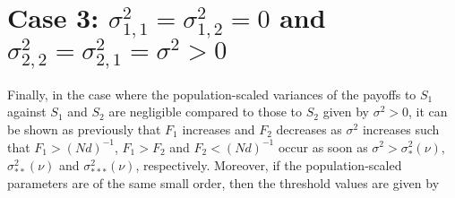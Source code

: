 \documentclass[11pt]{article}
\begin{document}
\section{Case 3: $\sigma^2_{1,1}=\sigma^2_{1,2}=0$ and $\sigma^2_{2,2}=\sigma^2_{2,1}=\sigma^2>0$}

Finally, in the case where the population-scaled variances of the payoffs to $S_1$ against $S_1$ and $S_2$ are negligible compared to those to $S_2$ given by $\sigma^2>0$, it can be shown as previously that $F_1$ increases and $F_2$ decreases as $\sigma^2$ increases such that $F_1>(Nd)^{-1}$, $F_1 > F_2$ and  $F_2<(Nd)^{-1}$ occur as soon as $\sigma^2 > \sigma^2_{*}(\nu),$ $\sigma^2_{**}(\nu)$ and $\sigma^2_{***}(\nu)$, respectively. Moreover, if the population-scaled parameters are of the same small order, then the threshold values are given by
\end{document}
